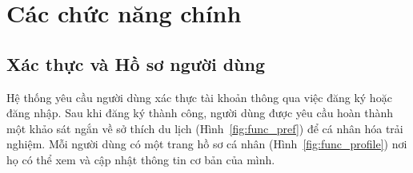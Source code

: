 \section{Các chức năng chính}
\label{sec:system_function}


\subsection{Xác thực và Hồ sơ người dùng}
\noindent Hệ thống yêu cầu người dùng xác thực tài khoản thông qua việc đăng ký hoặc đăng nhập. Sau khi đăng ký thành công, người dùng được yêu cầu hoàn thành một khảo sát ngắn về sở thích du lịch (Hình~\ref{fig:func_pref}) để cá nhân hóa trải nghiệm. Mỗi người dùng có một trang hồ sơ cá nhân (Hình~\ref{fig:func_profile}) nơi họ có thể xem và cập nhật thông tin cơ bản của mình.

